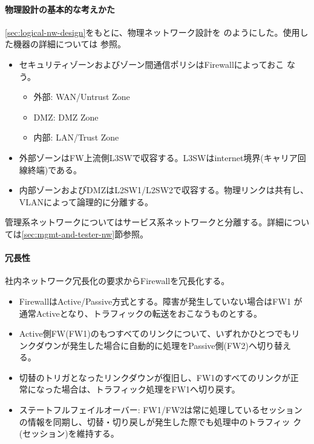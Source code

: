     \paragraph{物理設計の基本的な考えかた}
\ref{sec:logical-nw-design}をもとに、物理ネットワーク設計を
のようにした。使用した機器の詳細については
参照。
\begin{itemize}
 \item セキュリティゾーンおよびゾーン間通信ポリシはFirewallによっておこ
       なう。
       \begin{itemize}
        \item 外部: WAN/Untrust Zone
        \item DMZ: DMZ Zone
        \item 内部: LAN/Trust Zone
       \end{itemize}
 \item 外部ゾーンはFW上流側L3SWで収容する。L3SWはinternet境界(キャリア回
       線終端)である。
 \item 内部ゾーンおよびDMZはL2SW1/L2SW2で収容する。物理リンクは共有し、
       VLANによって論理的に分離する。
\end{itemize}

管理系ネットワークについてはサービス系ネットワークと分離する。詳細につい
ては\ref{sec:mgmt-and-tester-nw}節参照。

    \paragraph{冗長性}

社内ネットワーク冗長化の要求からFirewallを冗長化する。
\begin{itemize}
 \item FirewallはActive/Passive方式とする。障害が発生していない場合はFW1
       が通常Activeとなり、トラフィックの転送をおこなうものとする。
 \item Active側FW(FW1)のもつすべてのリンクについて、いずれかひとつでもリ
       ンクダウンが発生した場合に自動的に処理をPassive側(FW2)へ切り替え
       る。
 \item 切替のトリガとなったリンクダウンが復旧し、FW1のすべてのリンクが正
       常になった場合は、トラフィック処理をFW1へ切り戻す。
 \item ステートフルフェイルオーバー: FW1/FW2は常に処理しているセッション
       の情報を同期し、切替・切り戻しが発生した際でも処理中のトラフィッ
       ク(セッション)を維持する。
\end{itemize}

